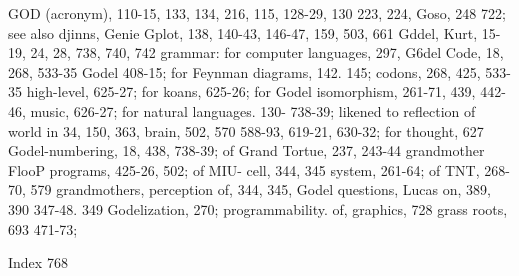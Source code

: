 GOD (acronym), 110-15, 133, 134, 216,           115, 128-29, 130
223, 224,                                       Goso, 248
722; see also djinns, Genie                     Gplot, 138, 140-43, 146-47, 159, 503, 661
Gddel, Kurt, 15-19, 24, 28, 738, 740, 742       grammar: for computer languages, 297,
G6del Code, 18, 268, 533-35 Godel               408-15; for Feynman diagrams, 142. 145;
codons, 268, 425, 533-35                        high-level, 625-27; for koans, 625-26; for
Godel isomorphism, 261-71, 439, 442-46,         music, 626-27; for natural languages. 130-
738-39; likened to reflection of world in       34, 150, 363,
brain, 502, 570                                 588-93, 619-21, 630-32; for thought, 627
Godel-numbering, 18, 438, 738-39; of            Grand Tortue, 237, 243-44 grandmother
FlooP programs, 425-26, 502; of MIU-            cell, 344, 345
system, 261-64; of TNT, 268-70, 579             grandmothers, perception of, 344, 345,
Godel questions, Lucas on, 389, 390             347-48. 349
Godelization, 270; programmability. of,         graphics, 728 grass roots, 693
471-73;



Index                                                                                   768

